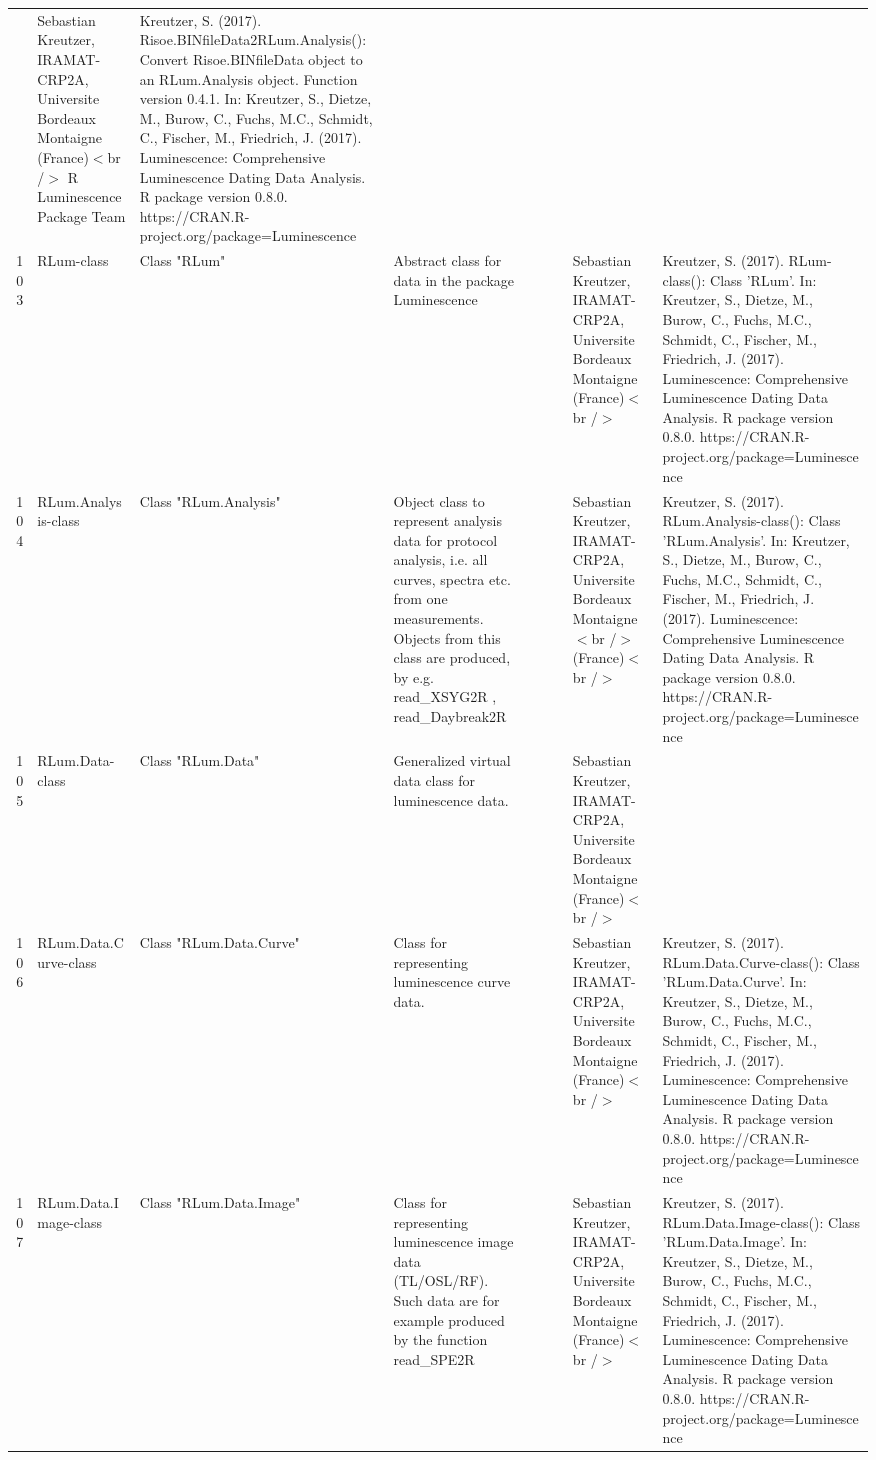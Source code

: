 \begin{table}[ht]
\begin{tabular}{rllllllll}
 & Sebastian Kreutzer, IRAMAT-CRP2A, Universite Bordeaux Montaigne (France)$<$br /$>$  R Luminescence Package Team & Kreutzer, S. (2017). Risoe.BINfileData2RLum.Analysis(): Convert Risoe.BINfileData object to an RLum.Analysis object. Function version 0.4.1. In: Kreutzer, S., Dietze, M., Burow, C., Fuchs, M.C., Schmidt, C., Fischer, M., Friedrich, J. (2017). Luminescence: Comprehensive Luminescence Dating Data Analysis. R package version 0.8.0. https://CRAN.R-project.org/package=Luminescence
 \\ 
  103 & RLum-class & Class  "RLum" & Abstract class for data in the package Luminescence &  &  &  & Sebastian Kreutzer, IRAMAT-CRP2A, Universite Bordeaux Montaigne (France)$<$br /$>$ & Kreutzer, S. (2017). RLum-class(): Class 'RLum'. In: Kreutzer, S., Dietze, M., Burow, C., Fuchs, M.C., Schmidt, C., Fischer, M., Friedrich, J. (2017). Luminescence: Comprehensive Luminescence Dating Data Analysis. R package version 0.8.0. https://CRAN.R-project.org/package=Luminescence
 \\ 
  104 & RLum.Analysis-class & Class  "RLum.Analysis" & Object class to represent analysis data for protocol analysis, i.e. all curves, spectra etc. from one measurements. Objects from this class are produced, by e.g.  read\_XSYG2R , read\_Daybreak2R &  &  &  & Sebastian Kreutzer, IRAMAT-CRP2A, Universite Bordeaux Montaigne$<$br /$>$ (France)$<$br /$>$ & Kreutzer, S. (2017). RLum.Analysis-class(): Class 'RLum.Analysis'. In: Kreutzer, S., Dietze, M., Burow, C., Fuchs, M.C., Schmidt, C., Fischer, M., Friedrich, J. (2017). Luminescence: Comprehensive Luminescence Dating Data Analysis. R package version 0.8.0. https://CRAN.R-project.org/package=Luminescence
 \\ 
  105 & RLum.Data-class & Class  "RLum.Data" & Generalized virtual data class for luminescence data. &  &  &  & Sebastian Kreutzer, IRAMAT-CRP2A, Universite Bordeaux Montaigne (France)$<$br /$>$ &  \\ 
  106 & RLum.Data.Curve-class & Class  "RLum.Data.Curve" & Class for representing luminescence curve data. &  &  &  & Sebastian Kreutzer, IRAMAT-CRP2A, Universite Bordeaux Montaigne (France)$<$br /$>$ & Kreutzer, S. (2017). RLum.Data.Curve-class(): Class 'RLum.Data.Curve'. In: Kreutzer, S., Dietze, M., Burow, C., Fuchs, M.C., Schmidt, C., Fischer, M., Friedrich, J. (2017). Luminescence: Comprehensive Luminescence Dating Data Analysis. R package version 0.8.0. https://CRAN.R-project.org/package=Luminescence
 \\ 
  107 & RLum.Data.Image-class & Class  "RLum.Data.Image" & Class for representing luminescence image data (TL/OSL/RF). Such data are for example produced by the function  read\_SPE2R &  &  &  & Sebastian Kreutzer, IRAMAT-CRP2A, Universite Bordeaux Montaigne (France)$<$br /$>$ & Kreutzer, S. (2017). RLum.Data.Image-class(): Class 'RLum.Data.Image'. In: Kreutzer, S., Dietze, M., Burow, C., Fuchs, M.C., Schmidt, C., Fischer, M., Friedrich, J. (2017). Luminescence: Comprehensive Luminescence Dating Data Analysis. R package version 0.8.0. https://CRAN.R-project.org/package=Luminescence

\end{tabular}
\end{table}
